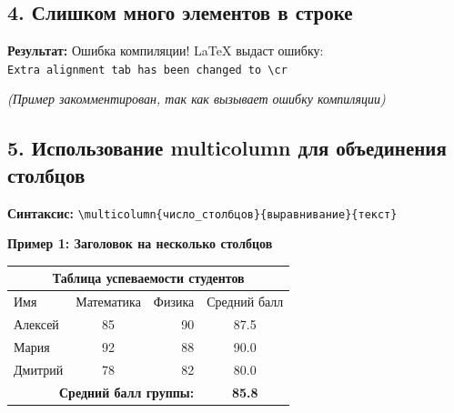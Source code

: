 \documentclass[12pt,a4paper]{article}
\begin{document}
\vspace{1cm}

\subsection*{4. Слишком много элементов в строке}

\textbf{Результат:} Ошибка компиляции! LaTeX выдаст ошибку:\\
\texttt{Extra alignment tab has been changed to \textbackslash cr}

\vspace{0.5cm}


\textit{(Пример закомментирован, так как вызывает ошибку компиляции)}

\vspace{1cm}

\subsection*{5. Использование multicolumn для объединения столбцов}

\textbf{Синтаксис:} \texttt{\textbackslash multicolumn\{число\_столбцов\}\{выравнивание\}\{текст\}}

\vspace{0.5cm}

\textbf{Пример 1: Заголовок на несколько столбцов}

\begin{tabular}{|l|c|r|c|}
\hline
\multicolumn{4}{|c|}{\textbf{Таблица успеваемости студентов}} \\
\hline
Имя & Математика & Физика & Средний балл \\
\hline
Алексей & 85 & 90 & 87.5 \\
Мария & 92 & 88 & 90.0 \\
Дмитрий & 78 & 82 & 80.0 \\
\hline
\multicolumn{3}{|r|}{\textbf{Средний балл группы:}} & \textbf{85.8} \\
\hline
\end{tabular}

\vspace{1cm}
\end{document}
